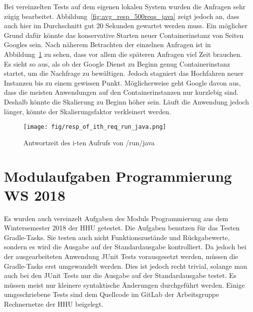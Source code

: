 Bei vereinzelten Tests auf dem eigenen lokalen System wurden die Anfragen
sehr zügig bearbeitet. Abbildung~\ref{fig:avg_resp_500reqs_java} zeigt jedoch
an, dass auch hier im Durchschnitt gut 20 Sekunden gewartet werden
muss. Ein möglicher Grund dafür könnte das konservative Starten
neuer Containerinstanz von Seiten Googles sein.
Nach näherem Betrachten der einzelnen Anfragen ist in
Abbildung~\ref{fig:resp_of_ith_req_run_java} zu sehen, dass vor allem
die späteren Anfragen viel Zeit brauchen. Es sieht so aus, als
ob der Google Dienst zu Beginn genug Containerinstanz startet, um
die Nachfrage zu bewältigen. Jedoch stagniert das Hochfahren neuer
Instanzen bis zu einem gewissen Punkt. Möglicherweise geht Google davon aus, dass
die meisten Anwendungen auf den Containerinstanzen nur kurzlebig sind.
Deshalb könnte die Skalierung zu Beginn höher sein. Läuft die
Anwendung jedoch länger, könnte der Skalierungsfaktor verkleinert werden.

\begin{figure}
  \centering
  \texttt{[image: fig/resp\_of\_ith\_req\_run\_java.png]}
  \caption{Antwortzeit des i-ten Aufrufs von /run/java}
  \label{fig:resp_of_ith_req_run_java}
\end{figure}

\section{Modulaufgaben Programmierung WS 2018}
Es wurden auch vereinzelt Aufgaben des Moduls Programmierung aus dem
Wintersemester 2018 der HHU getestet.
Die Aufgaben benutzen für das Testen Gradle-Tasks.
Sie testen auch nicht Funktionszustände und Rückgabewerte, sondern es wird die
Ausgabe auf der Standardausgabe kontrolliert.
Da jedoch bei der ausgearbeiteten Anwendung JUnit Tests vorausgesetzt werden,
müssen die Gradle-Tasks erst umgewandelt werden. Dies ist jedoch recht trivial,
solange man auch bei den JUnit Tests nur die Ausgabe auf der Standardausgabe
testet. Es müssen meist nur kleinere syntaktische Änderungen durchgeführt werden.
Einige umgeschriebene Tests sind dem Quellcode im GitLab der Arbeitsgruppe
Rechnernetze der HHU beigelegt.